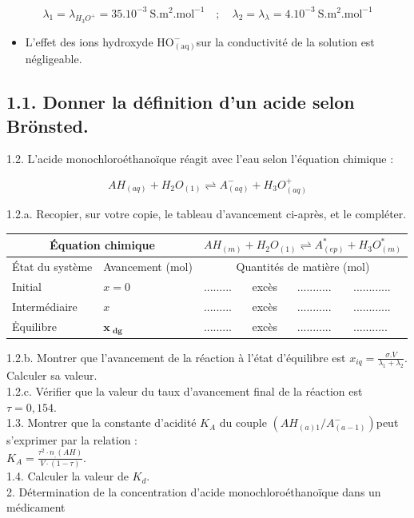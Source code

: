 $$
\lambda_{1}=\lambda_{H_{3} O^{+}}=35.10^{-3} \mathrm{~S} . \mathrm{m}^{2} . \mathrm{mol}^{-1} \quad ; \quad \lambda_{2}=\lambda_{\lambda}=4.10^{-3} \mathrm{~S} . \mathrm{m}^{2} . \mathrm{mol}^{-1}
$$

\begin{itemize}
  \item L'effet des ions hydroxyde $\mathrm{HO}_{(\mathrm{aq})}^{-}$sur la conductivité de la solution est négligeable.
\end{itemize}

\subsection*{1.1. Donner la définition d'un acide selon Brönsted.}
1.2. L'acide monochloroéthanoïque réagit avec l'eau selon l'équation chimique :

$$
A H_{(a q)}+H_{2} O_{(1)} \rightleftharpoons A_{(a q)}^{-}+H_{3} O_{(a q)}^{+}
$$

1.2.a. Recopier, sur votre copie, le tableau d'avancement ci-après, et le compléter.

\begin{center}
\begin{tabular}{|l|l|l|l|l|l|}
\hline
\multicolumn{2}{|c|}{Équation chimique} & \multicolumn{4}{|c|}{$A H_{(m)}+H_{2} O_{(1)} \rightleftharpoons A_{(e p)}^{*}+H_{3} O_{(m)}^{*}$} \\
\hline
État du système & Avancement (mol) & \multicolumn{4}{|c|}{Quantités de matière (mol)} \\
\hline
Initial & $x=0$ & ......... & excès & ........... & ............ \\
\hline
Intermédiaire & $x$ & ......... & excès & ........... & ............ \\
\hline
Ėquilibre & $\boldsymbol{x}_{\boldsymbol{\text { dg }}}$ & ......... & excès & ........... & ........... \\
\hline
\end{tabular}
\end{center}

1.2.b. Montrer que l'avancement de la réaction à l'état d'équilibre est $x_{i q}=\frac{\sigma . V}{\lambda_{1}+\lambda_{2}}$. Calculer sa valeur.\\
1.2.c. Vérifier que la valeur du taux d'avancement final de la réaction est $\tau=0,154$.\\
1.3. Montrer que la constante d'acidité $K_{A}$ du couple $\left(A H_{(a) 1} / A_{(a-1)}^{-}\right)$peut s'exprimer par la relation :\\
$K_{A}=\frac{\tau^{2} \cdot n_{,}(A H)}{V \cdot(1-\tau)}$.\\
1.4. Calculer la valeur de $K_{d}$.\\
2. Détermination de la concentration d'acide monochloroéthanoïque dans un médicament

